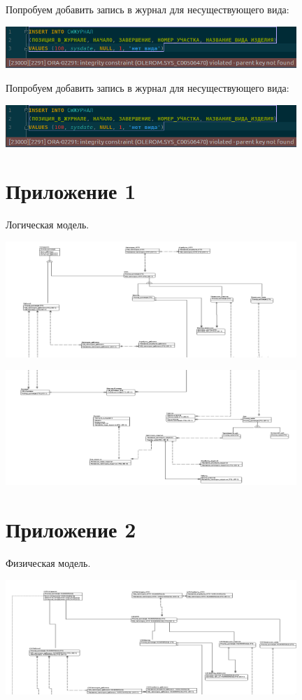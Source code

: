 Попробуем добавить запись в журнал для несуществующего вида:

\includegraphics[width=11cm]{./screenshots/constraints/list.png}

Попробуем добавить запись в журнал для несуществующего вида:

\includegraphics[width=11cm]{./screenshots/constraints/list.png}

\section{Приложение 1}

    Логическая модель.

    \includegraphics[width=11cm]{./screenshots/model/logical1.png}

    \includegraphics[width=11cm]{./screenshots/model/logical2.png}

\section{Приложение 2}

    Физическая модель.

    \includegraphics[width=11cm]{./screenshots/model/physical1.png}

